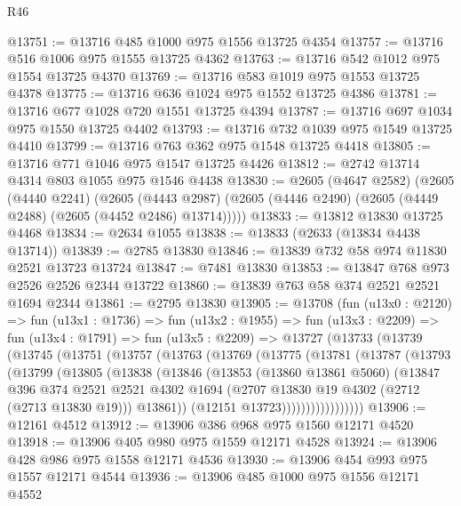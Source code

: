 \begin{lexlean}{R46}
\begin{coremodule}
@13751 := @13716 @485 @1000 @975 @1556 @13725 @4354
@13757 := @13716 @516 @1006 @975 @1555 @13725 @4362
@13763 := @13716 @542 @1012 @975 @1554 @13725 @4370
@13769 := @13716 @583 @1019 @975 @1553 @13725 @4378
@13775 := @13716 @636 @1024 @975 @1552 @13725 @4386
@13781 := @13716 @677 @1028 @720 @1551 @13725 @4394
@13787 := @13716 @697 @1034 @975 @1550 @13725 @4402
@13793 := @13716 @732 @1039 @975 @1549 @13725 @4410
@13799 := @13716 @763 @362 @975 @1548 @13725 @4418
@13805 := @13716 @771 @1046 @975 @1547 @13725 @4426
@13812 := @2742 @13714 @4314 @803 @1055 @975 @1546 @4438
@13830 := @2605
    (@4647 @2582)
    (@2605
      (@4440 @2241)
      (@2605
        (@4443 @2987)
        (@2605 (@4446 @2490) (@2605 (@4449 @2488) (@2605 (@4452 @2486) @13714)))))
@13833 := @13812 @13830 @13725 @4468
@13834 := @2634 @1055
@13838 := @13833 (@2633 (@13834 @4438 @13714))
@13839 := @2785 @13830
@13846 := @13839 @732 @58 @974 @11830 @2521 @13723 @13724
@13847 := @7481 @13830
@13853 := @13847 @768 @973 @2526 @2526 @2344 @13722
@13860 := @13839 @763 @58 @374 @2521 @2521 @1694 @2344
@13861 := @2795 @13830
@13905 := @13708
    (fun (u13x0 : @2120) =>
    fun (u13x1 : @1736) =>
    fun (u13x2 : @1955) =>
    fun (u13x3 : @2209) =>
    fun (u13x4 : @1791) =>
    fun (u13x5 : @2209) =>
    @13727
      (@13733
        (@13739
          (@13745
            (@13751
              (@13757
                (@13763
                  (@13769
                    (@13775
                      (@13781
                        (@13787
                          (@13793
                            (@13799
                              (@13805
                                (@13838
                                  (@13846
                                    (@13853
                                      (@13860 @13861 @5060)
                                      (@13847
                                        @396
                                        @374
                                        @2521
                                        @2521
                                        @4302
                                        @1694
                                        (@2707 @13830 @19 @4302 (@2712 (@2713 @13830 @19)))
                                        @13861))
                                    (@12151 @13723)))))))))))))))))
@13906 := @12161 @4512
@13912 := @13906 @386 @968 @975 @1560 @12171 @4520
@13918 := @13906 @405 @980 @975 @1559 @12171 @4528
@13924 := @13906 @428 @986 @975 @1558 @12171 @4536
@13930 := @13906 @454 @993 @975 @1557 @12171 @4544
@13936 := @13906 @485 @1000 @975 @1556 @12171 @4552

\end{coremodule}
\end{lexlean}
